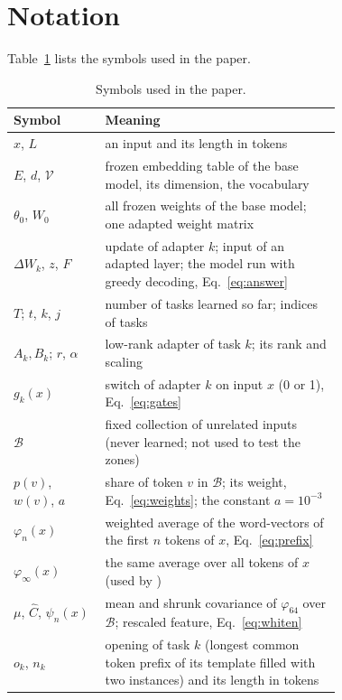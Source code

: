 \FloatBarrier
\section{Notation}
\label{app:notation}

Table~\ref{tab:notation} lists the symbols used in the paper.

\begin{table}[H]
  \caption{Symbols used in the paper.}
  \label{tab:notation}
  \centering
  \small
  \begin{tabular}{lp{0.72\linewidth}}
    \toprule
    Symbol & Meaning \\
    \midrule
        $x$, $L$ & an input and its length in tokens \\
    $E$, $d$, $\mathcal{V}$ & frozen embedding table of the base model, its dimension, the vocabulary \\
        $\theta_0$, $W_0$ & all frozen weights of the base model; one adapted weight matrix \\
    $\Delta W_k$, $z$, $F$ & update of adapter $k$; input of an adapted layer; the model run with greedy decoding, Eq.~\eqref{eq:answer} \\
    $T$; $t$, $k$, $j$ & number of tasks learned so far; indices of tasks \\
    $A_k, B_k$; $r$, $\alpha$ & low-rank adapter of task $k$; its rank and scaling \\
    $g_k(x)$ & switch of adapter $k$ on input $x$ (0 or 1), Eq.~\eqref{eq:gates} \\
    $\mathcal{B}$ & fixed collection of unrelated inputs (never learned; not used to test the zones) \\
    $p(v)$, $w(v)$, $a$ & share of token $v$ in $\mathcal{B}$; its weight, Eq.~\eqref{eq:weights}; the constant $a = 10^{-3}$ \\
            $\varphi_n(x)$ & weighted average of the word-vectors of the first $n$ tokens of $x$, Eq.~\eqref{eq:prefix} \\
    $\varphi_\infty(x)$ & the same average over all tokens of $x$ (used by \centre{}) \\
    $\mu$, $\hat{C}$, $\psi_n(x)$ & mean and shrunk covariance of $\varphi_{64}$ over $\mathcal{B}$; rescaled feature, Eq.~\eqref{eq:whiten} \\
    $o_k$, $n_k$ & opening of task $k$ (longest common token prefix of its template filled with two instances) and its length in tokens \\

\end{tabular}
\end{table}
